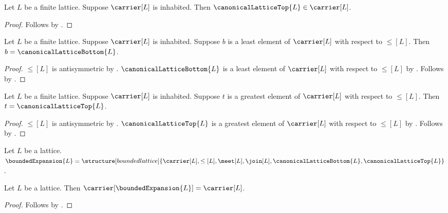 \begin{proposition}\label{canonical_lattice_top_type}
    Let $L$ be a finite lattice.
    Suppose $\carrier[L]$ is inhabited.
    Then $\canonicalLatticeTop{L}\in\carrier[L]$.
\end{proposition}
\begin{proof}
    Follows by .
\end{proof}

\begin{proposition}\label{canonical_lattice_bottom_unique}
    Let $L$ be a finite lattice.
    Suppose $\carrier[L]$ is inhabited.
    Suppose $b$ is a least element of $\carrier[L]$ with respect to $\leq[L]$.
    Then $b=\canonicalLatticeBottom{L}$.
\end{proposition}
\begin{proof}
    $\leq[L]$ is antisymmetric by
        .
    $\canonicalLatticeBottom{L}$ is a least element of $\carrier[L]$
        with respect to $\leq[L]$ by
        .
    Follows by .
\end{proof}

\begin{proposition}\label{canonical_lattice_top_unique}
    Let $L$ be a finite lattice.
    Suppose $\carrier[L]$ is inhabited.
    Suppose $t$ is a greatest element of $\carrier[L]$ with respect to
        $\leq[L]$.
    Then $t=\canonicalLatticeTop{L}$.
\end{proposition}
\begin{proof}
    $\leq[L]$ is antisymmetric by
        .
    $\canonicalLatticeTop{L}$ is a greatest element of $\carrier[L]$
        with respect to $\leq[L]$ by
        .
    Follows by .
\end{proof}

\begin{definition}\label{bounded_expansion}
    Let $L$ be a lattice.
    $\boundedExpansion{L}=
        \structure[bounded lattice]{
            \carrier[L],
            \leq[L],
            \meet[L],
            \join[L],
            \canonicalLatticeBottom{L},
            \canonicalLatticeTop{L}
        }$.
\end{definition}

\begin{proposition}\label{bounded_expansion_carrier}
    Let $L$ be a lattice.
    Then $\carrier[\boundedExpansion{L}]=\carrier[L]$.
\end{proposition}
\begin{proof}
    Follows by
        .
\end{proof}

